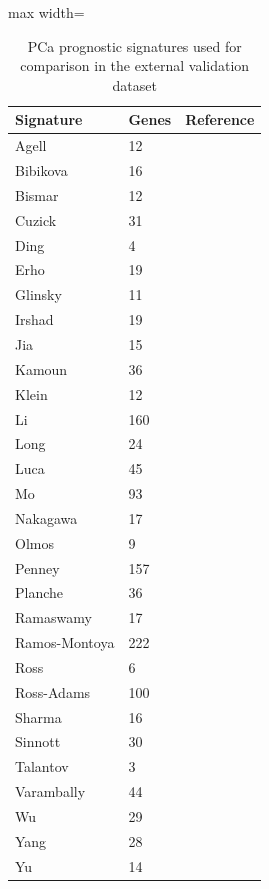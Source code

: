 \begin{table}[h!]
  \centering
  \caption[Prognostic signatures used for comparison in the external validation dataset]{PCa prognostic signatures used for comparison in the external validation dataset}
  \label{chp4supptable4}
  \footnotesize
  \begin{adjustbox}{max width=\textwidth}
  \begin{tabular}{llr}
  \toprule 
  \textbf{Signature} & \textbf{Genes} & \textbf{Reference}
  \\
  \toprule 
  Agell & 12 &  \cite{Agell2012Nov}
  \\
  Bibikova & 16 & \cite{Bibikova2007Jun}
  \\ 
  Bismar & 12 & \cite{Bismar2006Jan}
  \\ 
  Cuzick & 31 & \cite{Cuzick2011Mar}
  \\
  Ding & 4 & \cite{Ding2011Feb}
  \\ 
  Erho & 19 & \cite{Erho2013Jun}
  \\ 
  Glinsky & 11 & \cite{Glinsky2005Jun}
  \\ 
  Irshad & 19 & \cite{Irshad2013Sep}
  \\
  Jia & 15 & \cite{Jia2012}
  \\
  Kamoun & 36 & \cite{Kamoun2018}
  \\ 
  Klein & 12 & \cite{Klein2014Sep}
  \\
  Li & 160 & \cite{Li2021May}
  \\
  Long & 24 & \cite{Long2014}
  \\
  Luca & 45 & \cite{Luca2018}
    \\
  Mo & 93 & \cite{Mo2018Apr}
    \\ 
  Nakagawa & 17 & \cite{Nakagawa2008} 
    \\
  Olmos & 9 & \cite{Olmos2012Nov} 
    \\
  Penney & 157 & \cite{Penney2011Jun} 
    \\
  Planche & 36 & \cite{Planche2011} 
    \\
Ramaswamy & 17 & \cite{Ramaswamy2003Jan} 
  \\
Ramos-Montoya & 222 & \cite{Ramos-Montoya2014May} 
  \\
Ross & 6 & \cite{Ross2011} 
  \\
Ross-Adams & 100 & \cite{Ross-Adams2015Jul} 
  \\
Sharma & 16 & \cite{Sharma2013Jan} 
  \\
Sinnott & 30 & \cite{Sinnott2017Jan} 
  \\
Talantov & 3 & \cite{Talantov2010Oct} 
  \\
Varambally & 44 & \cite{Varambally2005Nov}
  \\
Wu & 29 & \cite{Wu2013Apr} 
  \\
Yang & 28 & \cite{Yang2018May} 
  \\
Yu & 14 & \cite{Yu2007Nov} 
  \\
  \toprule
  \end{tabular}
  \end{adjustbox}
  \end{table}


